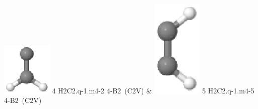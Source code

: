 \documentclass[10pt]{article}
\begin{document}
\begin{tabular}
\includegraphics[width=2.40000000000000000000cm]{H2C2.q-1.m4-2.eps} \tiny{4 \hspace{1.20000000000000000000cm} H2C2.q-1.m4-2 \hspace{5pt} 4-B2~(C2V)} &
\includegraphics[width=2.40000000000000000000cm]{H2C2.q-1.m4-5.eps} \tiny{5 \hspace{1.20000000000000000000cm} H2C2.q-1.m4-5 \hspace{5pt} 4-B2~(C2V)} 
\\
\end{tabular}
\end{document}
